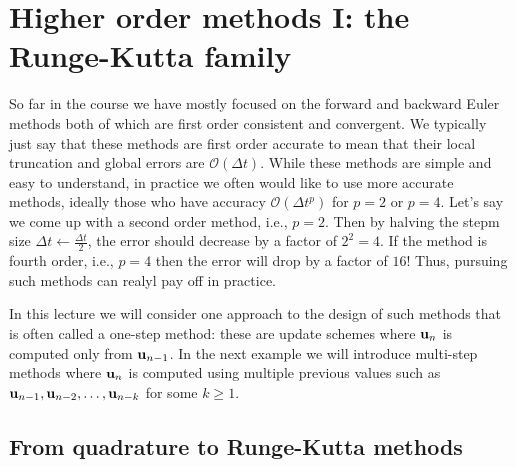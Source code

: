 \chapter{Higher order methods I: the Runge-Kutta family}

So far in the course we have mostly focused on 
the forward and backward Euler methods both of 
which are first order consistent and convergent. We typically 
just say that these methods are first order accurate to mean 
that their local truncation and global errors are 
$\mathcal{O}(\Delta t)$. While these methods are simple and easy 
to understand, in practice we often would like to use more accurate 
methods, ideally those who have accuracy $\mathcal{O}(\Delta t^p)$ 
for $p=2$ or $p=4$. Let's say we come up with a second order method, 
i.e., $p=2$. Then by halving the stepm size $\Delta t \leftarrow \frac{\Delta t}{2}$, the error should decrease by a factor of $2^2 = 4$. If the method 
is fourth order, i.e., $p=4$ then the error will drop by 
a factor of $16$! Thus, pursuing such methods can realyl pay off in practice. 

In this lecture we will consider one approach to the design of such methods 
that is often called a one-step method: these are 
update schemes where $\mathbf{u}_{n}$ is computed only from $\mathbf{u}_{n-1}$. In 
the next example we will introduce multi-step methods where $\mathbf{u}_{n}$ 
is computed using multiple previous values such as 
$\mathbf{u}_{n-1}, \mathbf{u}_{n-2}, \dots, \mathbf{u}_{n-k}$ for some $k \ge 1$.


\section{From quadrature to Runge-Kutta methods}

